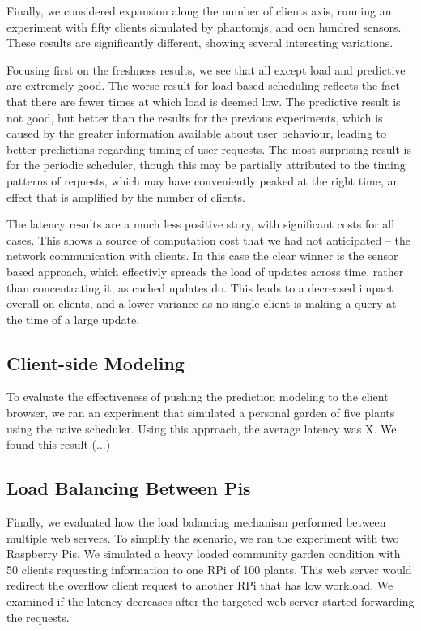 \documentclass[a4paper]{acm_proc_article-sp}
\begin{document}
Finally, we considered expansion along the number of clients axis, running an experiment with fifty clients simulated by phantomjs, and oen hundred sensors.  These results are significantly different, showing several interesting variations.

Focusing first on the freshness results, we see that all except load and predictive are extremely good.  The worse result for load based scheduling reflects the fact that there are fewer times at which load is deemed low.  The predictive result is not good, but better than the results for the previous experiments, which is caused by the greater information available about user behaviour, leading to better predictions regarding timing of user requests.  The most surprising result is for the periodic scheduler, though this may be partially attributed to the timing patterns of requests, which may have conveniently peaked at the right time, an effect that is amplified by the number of clients.

The latency results are a much less positive story, with significant costs for all cases.  This shows a source of computation cost that we had not anticipated -- the network communication with clients.  In this case the clear winner is the sensor based approach, which effectivly spreads the load of updates across time, rather than concentrating it, as cached updates do.  This leads to a decreased impact overall on clients, and a lower variance as no single client is making a query at the time of a large update.

\subsection{Client-side Modeling}

To evaluate the effectiveness of pushing the prediction modeling to the client browser, we ran an experiment that simulated a personal garden of five plants using the naive scheduler.  Using this approach, the average latency was X. We found this result (...)

\subsection{Load Balancing Between Pis}

Finally, we evaluated how the load balancing mechanism performed between multiple web servers. To simplify the scenario, we ran the experiment with two Raspberry Pis. We simulated a heavy loaded community garden condition with 50 clients requesting information to one RPi of 100 plants. This web server would redirect the overflow client request to another RPi that has low workload. We examined if the latency decreases after the targeted web server started forwarding the requests.
\end{document}
